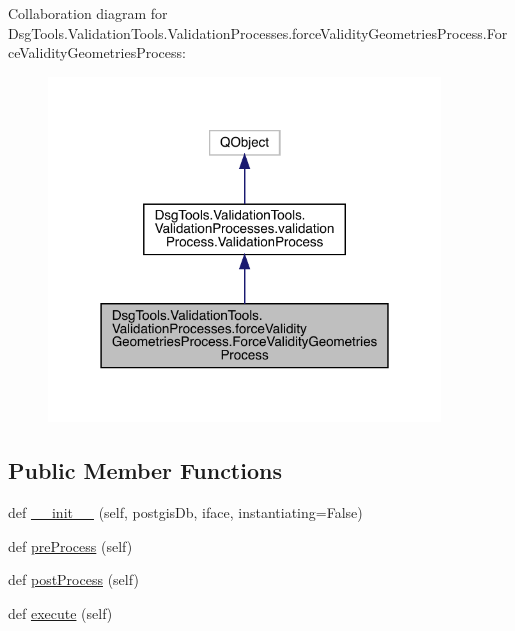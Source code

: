 Collaboration diagram for Dsg\+Tools.\+Validation\+Tools.\+Validation\+Processes.\+force\+Validity\+Geometries\+Process.\+Force\+Validity\+Geometries\+Process\+:
\nopagebreak
\begin{figure}[H]
\begin{center}
\leavevmode
\includegraphics[width=295pt]{class_dsg_tools_1_1_validation_tools_1_1_validation_processes_1_1force_validity_geometries_procee6835d7abdb42398023eeb820d8fe44e}
\end{center}
\end{figure}
\subsection*{Public Member Functions}
\begin{DoxyCompactItemize}
\item 
def \mbox{\hyperlink{class_dsg_tools_1_1_validation_tools_1_1_validation_processes_1_1force_validity_geometries_proceb6c6e9dee7ed1346c8f2b65740bae4ad_a7fa21a8fe43ba5b5c7163be356c27f4a}{\+\_\+\+\_\+init\+\_\+\+\_\+}} (self, postgis\+Db, iface, instantiating=False)
\item 
def \mbox{\hyperlink{class_dsg_tools_1_1_validation_tools_1_1_validation_processes_1_1force_validity_geometries_proceb6c6e9dee7ed1346c8f2b65740bae4ad_a655c76d0d7012563fcea05c9049039d7}{pre\+Process}} (self)
\item 
def \mbox{\hyperlink{class_dsg_tools_1_1_validation_tools_1_1_validation_processes_1_1force_validity_geometries_proceb6c6e9dee7ed1346c8f2b65740bae4ad_a4d1a623abbf74fd30bd3cd6325cae4be}{post\+Process}} (self)
\item 
def \mbox{\hyperlink{class_dsg_tools_1_1_validation_tools_1_1_validation_processes_1_1force_validity_geometries_proceb6c6e9dee7ed1346c8f2b65740bae4ad_ac86be6762de7fbed8e61e205bfb8b143}{execute}} (self)
\end{DoxyCompactItemize}
